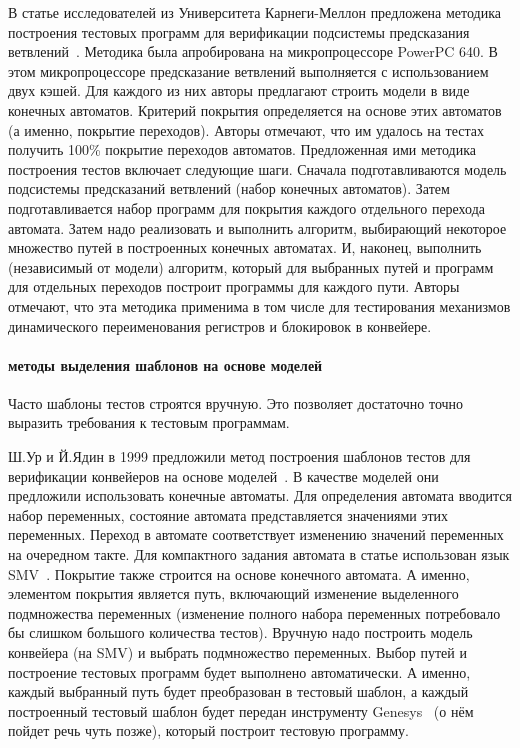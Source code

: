 \documentclass[14pt]{extreport}
\begin{document}
В статье исследователей из Университета Карнеги-Меллон предложена методика построения тестовых программ для верификации подсистемы предсказания ветвлений~\cite{Branches99}. Методика была апробирована на микропроцессоре PowerPC 640. В этом микропроцессоре предсказание ветвлений выполняется с использованием двух кэшей. Для каждого из них авторы предлагают строить модели в виде конечных автоматов. Критерий покрытия определяется на основе этих автоматов (а именно, покрытие переходов). Авторы отмечают, что им удалось на тестах получить 100\% покрытие переходов автоматов. Предложенная ими методика построения тестов включает следующие шаги. Сначала подготавливаются модель подсистемы предсказаний ветвлений (набор конечных автоматов). Затем подготавливается набор программ для покрытия каждого отдельного перехода автомата. Затем надо реализовать и выполнить алгоритм, выбирающий некоторое множество путей в построенных конечных автоматах. И, наконец, выполнить (независимый от модели) алгоритм, который для выбранных путей и программ для отдельных переходов построит программы для каждого пути. Авторы отмечают, что эта методика применима в том числе для тестирования механизмов динамического переименования регистров и блокировок в конвейере.

\paragraph{методы выделения шаблонов на основе моделей}

Часто шаблоны тестов строятся вручную. Это позволяет достаточно точно выразить требования к тестовым программам.

Ш.Ур и Й.Ядин в 1999 предложили метод построения шаблонов тестов для верификации конвейеров на основе моделей~\cite{UrFSM}. В качестве моделей они предложили использовать конечные автоматы. Для определения автомата вводится набор переменных, состояние автомата представляется значениями этих переменных. Переход в автомате соответствует изменению значений переменных на очередном такте. Для компактного задания автомата в статье использован язык SMV~\cite{SMV}. Покрытие также строится на основе конечного автомата. А именно, элементом покрытия является путь, включающий изменение выделенного подмножества переменных (изменение полного набора переменных потребовало бы слишком большого количества тестов). Вручную надо построить модель конвейера (на SMV) и выбрать подмножество переменных. Выбор путей и построение тестовых программ будет выполнено автоматически. А именно, каждый выбранный путь будет преобразован в тестовый шаблон, а каждый построенный тестовый шаблон будет передан инструменту Genesys~\cite{Genesys} (о нём пойдет речь чуть позже), который построит тестовую программу.
\end{document}
